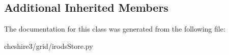 \subsection*{Additional Inherited Members}


The documentation for this class was generated from the following file\-:\begin{DoxyCompactItemize}
\item 
cheshire3/grid/irods\-Store.\-py\end{DoxyCompactItemize}
